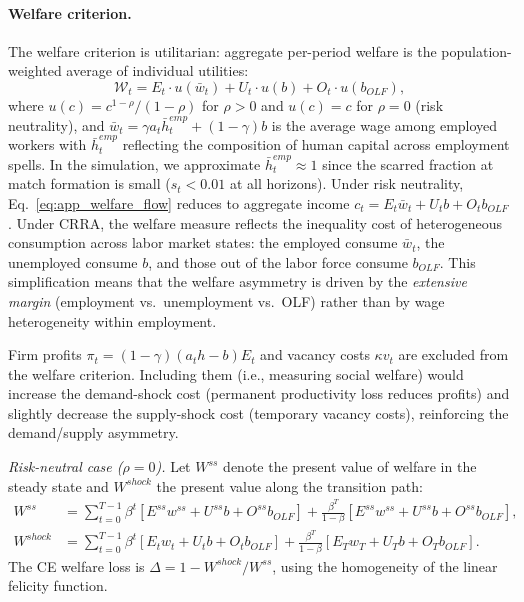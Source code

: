 \documentclass[12pt]{article}
\begin{document}
\paragraph{Welfare criterion.} The welfare criterion is utilitarian: aggregate per-period welfare is the population-weighted average of individual utilities:
\begin{equation}
\mathcal{W}_t = E_t \cdot u(\bar{w}_t) + U_t \cdot u(b) + O_t \cdot u(b_{OLF}),
\label{eq:app_welfare_flow}
\end{equation}
where $u(c) = c^{1-\rho}/(1-\rho)$ for $\rho > 0$ and $u(c) = c$ for $\rho = 0$ (risk neutrality), and $\bar{w}_t = \gamma a_t \bar{h}_t^{emp} + (1-\gamma)b$ is the average wage among employed workers with $\bar{h}_t^{emp}$ reflecting the composition of human capital across employment spells. In the simulation, we approximate $\bar{h}_t^{emp} \approx 1$ since the scarred fraction at match formation is small ($s_t < 0.01$ at all horizons). Under risk neutrality, Eq.~\ref{eq:app_welfare_flow} reduces to aggregate income $c_t = E_t \bar{w}_t + U_t b + O_t b_{OLF}$. Under CRRA, the welfare measure reflects the inequality cost of heterogeneous consumption across labor market states: the employed consume $\bar{w}_t$, the unemployed consume $b$, and those out of the labor force consume $b_{OLF}$. This simplification means that the welfare asymmetry is driven by the \textit{extensive margin} (employment vs.\ unemployment vs.\ OLF) rather than by wage heterogeneity within employment.

Firm profits $\pi_t = (1-\gamma)(a_t h - b) E_t$ and vacancy costs $\kappa v_t$ are excluded from the welfare criterion. Including them (i.e., measuring social welfare) would increase the demand-shock cost (permanent productivity loss reduces profits) and slightly decrease the supply-shock cost (temporary vacancy costs), reinforcing the demand/supply asymmetry.

\textit{Risk-neutral case ($\rho = 0$).} Let $W^{ss}$ denote the present value of welfare in the steady state and $W^{shock}$ the present value along the transition path:
\begin{align}
W^{ss} &= \sum_{t=0}^{T-1} \beta^t \left[ E^{ss} w^{ss} + U^{ss} b + O^{ss} b_{OLF} \right] + \frac{\beta^T}{1-\beta}\left[ E^{ss} w^{ss} + U^{ss} b + O^{ss} b_{OLF} \right], \label{eq:app_Wss} \\
W^{shock} &= \sum_{t=0}^{T-1} \beta^t \left[ E_t w_t + U_t b + O_t b_{OLF} \right] + \frac{\beta^T}{1-\beta}\left[ E_T w_T + U_T b + O_T b_{OLF} \right]. \label{eq:app_Wshock}
\end{align}
The CE welfare loss is $\Delta = 1 - W^{shock}/W^{ss}$, using the homogeneity of the linear felicity function.
\end{document}
